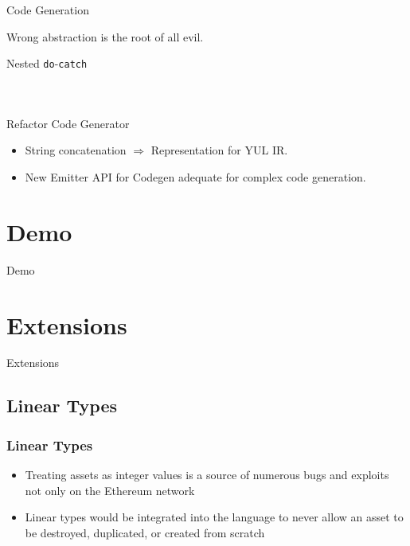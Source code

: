 \documentclass[aspectratio=169]{beamer}
\newcommand{\sectionslide}[1]{%
  \section{#1}
  \begin{frame}
  \begin{center}
    \vbox{}
    {\LARGE \usebeamercolor[fg]{title} #1}
    \par
  \end{center}
  \end{frame}
}
\begin{document}
\begin{frame}{Code Generation}

Wrong abstraction is the root of all evil.
\end{frame}

\begin{frame}{Nested \texttt{do}-\texttt{catch}}
\begin{columns}
    \begin{column}{0.5\textwidth}
        \inputminted[fontsize=\small]{swift}{code/nested-do.flint}
    \end{column}
    \begin{column}{0.5\textwidth}
        \inputminted[fontsize=\small]{swift}{code/nested-do-catch.flint}
    \end{column}
\end{columns}
\end{frame}

\begin{frame}{Refactor Code Generator}
\begin{itemize}
    \item String concatenation $\Rightarrow$ Representation for YUL IR.
    \item New Emitter API for Codegen adequate for complex code generation.
\end{itemize}
\end{frame}

\sectionslide{Demo}

\sectionslide{Extensions}
\subsection{Linear Types}

\begin{frame}
\frametitle{Linear Types}
\begin{itemize}
    \item Treating assets as integer values is a source of numerous bugs and exploits not only on the Ethereum network
    \item Linear types would be integrated into the language to never allow an asset to be destroyed, duplicated, or created from scratch
\end{itemize}
\end{frame}
\end{document}
